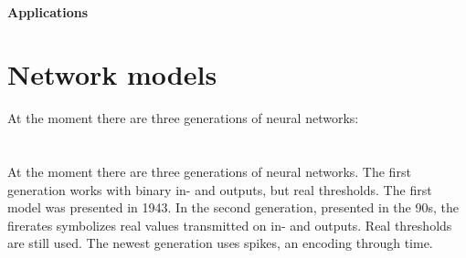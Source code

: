 \documentclass[10pt,a4paper,DIV=11]{scrreprt}
\begin{document}
\paragraph{Applications}






\section{Network models}
At the moment there are three generations of neural networks: \\


   \\
\\

At the moment there are three generations of neural networks. 
The first generation works with binary in- and outputs, but real thresholds. The first model was presented in 1943.
In the second generation, presented in the 90s, the firerates symbolizes real values transmitted on in- and outputs. Real thresholds are still used.
The newest generation uses spikes, an encoding through time.
\end{document}
